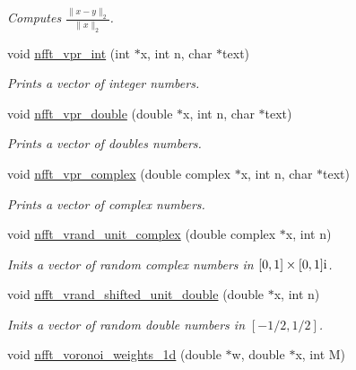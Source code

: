 \begin{CompactItemize}
\begin{CompactList}\small\item\em Computes $\frac{\|x-y\|_2}{\|x\|_2} $. \item\end{CompactList}\item 
\hypertarget{group__nfftutil_ga43}{
void \hyperlink{group__nfftutil_ga43}{nfft\_\-vpr\_\-int} (int $\ast$x, int n, char $\ast$text)}
\label{group__nfftutil_ga43}

\begin{CompactList}\small\item\em Prints a vector of integer numbers. \item\end{CompactList}\item 
\hypertarget{group__nfftutil_ga44}{
void \hyperlink{group__nfftutil_ga44}{nfft\_\-vpr\_\-double} (double $\ast$x, int n, char $\ast$text)}
\label{group__nfftutil_ga44}

\begin{CompactList}\small\item\em Prints a vector of doubles numbers. \item\end{CompactList}\item 
\hypertarget{group__nfftutil_ga45}{
void \hyperlink{group__nfftutil_ga45}{nfft\_\-vpr\_\-complex} (double complex $\ast$x, int n, char $\ast$text)}
\label{group__nfftutil_ga45}

\begin{CompactList}\small\item\em Prints a vector of complex numbers. \item\end{CompactList}\item 
\hypertarget{group__nfftutil_ga46}{
void \hyperlink{group__nfftutil_ga46}{nfft\_\-vrand\_\-unit\_\-complex} (double complex $\ast$x, int n)}
\label{group__nfftutil_ga46}

\begin{CompactList}\small\item\em Inits a vector of random complex numbers in $[0,1]\times[0,1]{\rm i}$. \item\end{CompactList}\item 
\hypertarget{group__nfftutil_ga47}{
void \hyperlink{group__nfftutil_ga47}{nfft\_\-vrand\_\-shifted\_\-unit\_\-double} (double $\ast$x, int n)}
\label{group__nfftutil_ga47}

\begin{CompactList}\small\item\em Inits a vector of random double numbers in $[-1/2,1/2]$. \item\end{CompactList}\item 
\hypertarget{group__nfftutil_ga48}{
void \hyperlink{group__nfftutil_ga48}{nfft\_\-voronoi\_\-weights\_\-1d} (double $\ast$w, double $\ast$x, int M)}
\label{group__nfftutil_ga48}


\end{CompactItemize}
